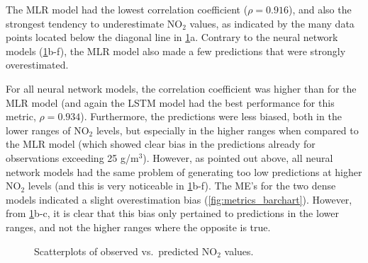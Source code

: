 The MLR model had the lowest correlation coefficient ($\rho = 0.916$), and also the strongest tendency to underestimate NO$_2$ values, as indicated by the many data points located below the diagonal line in \cref{fig:correlations}a. Contrary to the neural network models (\cref{fig:correlations}b-f), the MLR model also made a few predictions that were strongly overestimated. 

For all neural network models, the correlation coefficient was higher than for the MLR model (and again the LSTM model had the best performance for this metric, $\rho=0.934$). Furthermore, the predictions were less biased, both in the lower ranges of NO$_2$ levels, but especially in the higher ranges when compared to the MLR model (which showed clear bias in the predictions already for observations exceeding 25 \textmugreek g/m$^3$). However, as pointed out above, all neural network models had the same problem of generating too low predictions at higher NO$_2$ levels (and this is very noticeable in \cref{fig:correlations}b-f). The ME's for the two dense models indicated a slight overestimation bias (\cref{fig:metrics_barchart}). However, from \cref{fig:correlations}b-c, it is clear that this bias only pertained to predictions in the lower ranges, and not the higher ranges where the opposite is true.
 
\begin{figure}[h]
\centering
\caption{Scatterplots of observed vs.\ predicted NO$_2$ values.}
\label{fig:correlations}
\end{figure}

